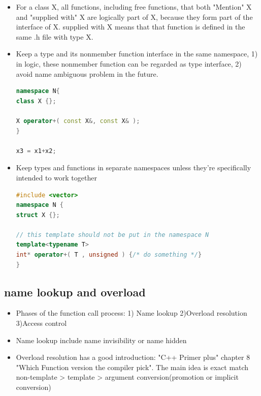 \documentclass[a4paper,12pt,twoside]{book}
\begin{document}
\begin{itemize}
\item For a class X, all functions, including free functions, that both "Mention" X
and "supplied with" X are logically part of X, because they form part of the interface of X. supplied with X means that that function is defined in the same .h file with type X. 

\item Keep a type and its nonmember function interface in the same namespace, 1) in logic, these nonmember function can be regarded as type interface, 2) avoid name ambiguous problem in the future.
\begin{lstlisting}[frame=single, language=c++]
namespace N{
class X {};

X operator+( const X&, const X& );
}

x3 = x1+x2;
\end{lstlisting}

\item Keep types and functions in separate namespaces unless they're specifically intended to work together

\begin{lstlisting}[frame=single, language=c++]
#include <vector>
namespace N {
struct X {};

// this template should not be put in the namespace N
template<typename T>
int* operator+( T , unsigned ) {/* do something */}
}
\end{lstlisting}

\end{itemize}



\subsection{name lookup and overload}
\begin{itemize}

\item Phases of the function call process: 1) Name lookup 2)Overload resolution 3)Access control

\item Name lookup include name invisibility or name hidden

\item Overload resolution has a good introduction: "C++ Primer plus" chapter 8 "Which Function version the compiler pick". The main idea is exact match non-template > template > argument conversion(promotion or implicit conversion)

\end{itemize}
\end{document}
